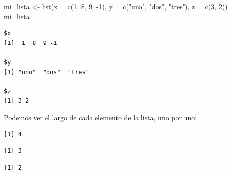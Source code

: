 \documentclass[
]{book}
\newenvironment{Shaded}{\begin{snugshade}}{\end{snugshade}}
\newcommand{\AttributeTok}[1]{\textcolor[rgb]{0.77,0.63,0.00}{#1}}
\newcommand{\DecValTok}[1]{\textcolor[rgb]{0.00,0.00,0.81}{#1}}
\newcommand{\FunctionTok}[1]{\textcolor[rgb]{0.00,0.00,0.00}{#1}}
\newcommand{\NormalTok}[1]{#1}
\newcommand{\OtherTok}[1]{\textcolor[rgb]{0.56,0.35,0.01}{#1}}
\newcommand{\SpecialCharTok}[1]{\textcolor[rgb]{0.00,0.00,0.00}{#1}}
\newcommand{\StringTok}[1]{\textcolor[rgb]{0.31,0.60,0.02}{#1}}
\begin{document}
\begin{Shaded}
\begin{Highlighting}[]
\NormalTok{mi\_lista }\OtherTok{\textless{}{-}} \FunctionTok{list}\NormalTok{(}\AttributeTok{x =} \FunctionTok{c}\NormalTok{(}\DecValTok{1}\NormalTok{, }\DecValTok{8}\NormalTok{, }\DecValTok{9}\NormalTok{, }\SpecialCharTok{{-}}\DecValTok{1}\NormalTok{), }\AttributeTok{y =} \FunctionTok{c}\NormalTok{(}\StringTok{"uno"}\NormalTok{, }\StringTok{"dos"}\NormalTok{, }\StringTok{"tres"}\NormalTok{), }\AttributeTok{z =} \FunctionTok{c}\NormalTok{(}\DecValTok{3}\NormalTok{, }\DecValTok{2}\NormalTok{))}
\NormalTok{mi\_lista}
\end{Highlighting}
\end{Shaded}

\begin{verbatim}
$x
[1]  1  8  9 -1

$y
[1] "uno"  "dos"  "tres"

$z
[1] 3 2
\end{verbatim}

Podemos ver el largo de cada elemento de la lista, uno por uno:

\begin{Shaded}
\end{Shaded}

\begin{verbatim}
[1] 4
\end{verbatim}

\begin{Shaded}
\end{Shaded}

\begin{verbatim}
[1] 3
\end{verbatim}

\begin{Shaded}
\end{Shaded}

\begin{verbatim}
[1] 2
\end{verbatim}
\end{document}
